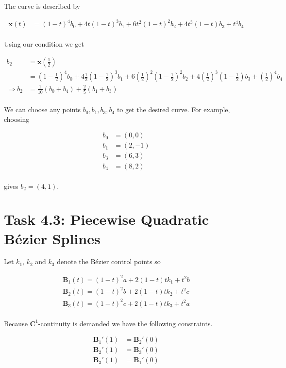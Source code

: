 \documentclass[paper=a4, fontsize=11pt]{scrartcl} %
\numberwithin{equation}{section} %
\numberwithin{figure}{section} %
\numberwithin{table}{section} %
\begin{document}
The curve is described by

\begin{align*}
  \mathbf{x}(t) &= (1-t)^4b_0 + 4t(1-t)^3b_1 + 6t^2(1-t)^2b_2 + 4t^3(1-t)b_3 + t^4b_4\\
\end{align*}

Using our condition we get

\begin{align*}
  b_2 &= \mathbf{x}(\frac{1}{2})\\
      &= (1 - \frac{1}{2})^4b_0 + 4\frac{1}{2}(1-\frac{1}{2})^3b_1 + 6(\frac{1}{2})^2(1-\frac{1}{2})^2b_2 + 4(\frac{1}{2})^3(1-\frac{1}{2})b_3 + (\frac{1}{2})^4b_4\\
  \Rightarrow b_2 &= \frac{1}{10}(b_0 + b_4) + \frac{2}{5}(b_1 + b_3)\\
\end{align*}

We can choose any points $b_0, b_1, b_3, b_4$ to get the desired curve. For example, choosing

\begin{align*}
  b_0 &= (0,0)\\
  b_1 &= (2,-1)\\
  b_3 &= (6,3)\\
  b_4 &= (8,2)\\
\end{align*}

gives $b_2 = (4,1)$.

\section*{Task 4.3: Piecewise Quadratic B\'ezier Splines}

Let $k_1$, $k_2$ and $k_3$ denote the B\'ezier control points so

\begin{align*}
  \mathbf {B}_1(t)=(1-t)^{2}a+2(1-t)tk_1+t^{2}b\\
  \mathbf {B}_2(t)=(1-t)^{2}b+2(1-t)tk_2+t^{2}c\\
  \mathbf {B}_3(t)=(1-t)^{2}c+2(1-t)tk_3+t^{2}a\\
\end{align*}

Because $\mathbf{C}^1$-continuity is demanded we have the following constraints.

\begin{align*}
  \mathbf{B}_1'(1) &= \mathbf{B}_2'(0)\\
  \mathbf{B}_2'(1) &= \mathbf{B}_3'(0)\\
  \mathbf{B}_3'(1) &= \mathbf{B}_1'(0)\\
\end{align*}
\end{document}
